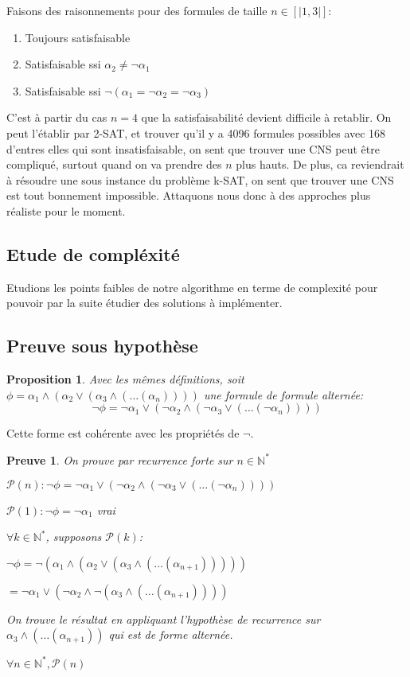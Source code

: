 \documentclass{paper}
\newtheorem{prop}{Proposition}
\newtheorem{preuve}{Preuve}
\begin{document}
Faisons des raisonnements pour des formules de taille $n\in [|1, 3|]$:
\begin{enumerate}
    \item Toujours satisfaisable
    \item Satisfaisable ssi $\alpha_2 \neq \lnot\alpha_1$
    \item Satisfaisable ssi $\lnot(\alpha_1 = \lnot\alpha_2 = \lnot\alpha_3)$
\end{enumerate}
C'est à partir du cas $n=4$ que la satisfaisabilité devient difficile à retablir. On peut l'établir par 2-SAT, et trouver qu'il y a 
4096 formules possibles avec 168 d'entres elles qui sont insatisfaisable, on sent que trouver une CNS peut être compliqué, surtout quand
on va prendre des $n$ plus hauts.
De plus, ca reviendrait à résoudre une sous instance du problème k-SAT, on sent que trouver une CNS est tout bonnement impossible.
Attaquons nous donc à des approches plus réaliste pour le moment.



\subsection{Etude de compléxité}

Etudions les points faibles de notre algorithme en terme de complexité pour pouvoir par la suite étudier des solutions à implémenter.








\subsection{Preuve sous hypothèse}

\begin{prop}
    Avec les mêmes définitions, soit $\phi = \alpha_1 \land (\alpha_2 \lor (\alpha_3 \land (\dots (\alpha_n))))$ une formule de formule alternée:
    $$\lnot\phi = \lnot\alpha_1 \lor (\lnot\alpha_2 \land (\lnot\alpha_3 \lor (\dots (\lnot\alpha_n))))$$
\end{prop}
Cette forme est cohérente avec les propriétés de $\lnot$.

\begin{preuve}
    On prouve par recurrence forte sur $n\in\mathbb{N}^*$

    $\mathcal{P}(n): \lnot\phi = \lnot\alpha_1 \lor (\lnot\alpha_2 \land (\lnot\alpha_3 \lor (\dots (\lnot\alpha_n))))$

    $\mathcal{P}(1): \lnot\phi = \lnot\alpha_1$ vrai

    $\forall k\in\mathbb{N}^*$, supposons $\mathcal{P}(k)$:

    $\lnot\phi = \lnot (\alpha_1 \land (\alpha_2 \lor (\alpha_3 \land (\dots (\alpha_{n+1})))))$

    $= \lnot\alpha_1 \lor (\lnot\alpha_2 \land \lnot(\alpha_3 \land (\dots (\alpha_{n+1}))))$

    On trouve le résultat en appliquant l'hypothèse de recurrence sur $\alpha_3 \land (\dots (\alpha_{n+1}))$ qui est de forme alternée.

    $\forall n\in\mathbb{N}^*, \mathcal{P}(n)$
\end{preuve}
\end{document}
